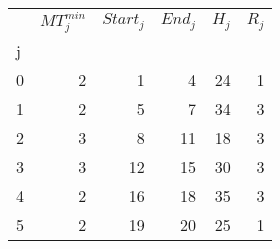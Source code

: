 \begin{tabular}{lrrrrr}
\toprule
{} &  $MT^{min}_{j}$ &  $Start_j$ &  $End_j$ &  $H_{j}$ &  $R_{j}$ \\
j &                 &            &          &          &          \\
\midrule
0 &               2 &          1 &        4 &       24 &        1 \\
1 &               2 &          5 &        7 &       34 &        3 \\
2 &               3 &          8 &       11 &       18 &        3 \\
3 &               3 &         12 &       15 &       30 &        3 \\
4 &               2 &         16 &       18 &       35 &        3 \\
5 &               2 &         19 &       20 &       25 &        1 \\
\bottomrule
\end{tabular}